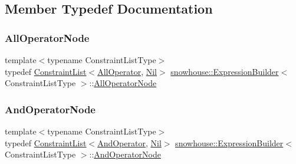 \subsection{Member Typedef Documentation}
\mbox{\label{structsnowhouse_1_1ExpressionBuilder_a25ac097d527e6c4fabd98aa1334a42c6}} 
\subsubsection{\texorpdfstring{AllOperatorNode}{AllOperatorNode}}
{\footnotesize\ttfamily template$<$typename Constraint\+List\+Type$>$ \\
typedef \mbox{\hyperlink{structsnowhouse_1_1ConstraintList}{Constraint\+List}}$<$\mbox{\hyperlink{structsnowhouse_1_1AllOperator}{All\+Operator}}, \mbox{\hyperlink{structsnowhouse_1_1Nil}{Nil}}$>$ \mbox{\hyperlink{structsnowhouse_1_1ExpressionBuilder}{snowhouse\+::\+Expression\+Builder}}$<$ Constraint\+List\+Type $>$\+::\mbox{\hyperlink{structsnowhouse_1_1ExpressionBuilder_a25ac097d527e6c4fabd98aa1334a42c6}{All\+Operator\+Node}}}

\mbox{\label{structsnowhouse_1_1ExpressionBuilder_acfa4ad415e3fac4f1a161d56268a99fc}} 
\subsubsection{\texorpdfstring{AndOperatorNode}{AndOperatorNode}}
{\footnotesize\ttfamily template$<$typename Constraint\+List\+Type$>$ \\
typedef \mbox{\hyperlink{structsnowhouse_1_1ConstraintList}{Constraint\+List}}$<$\mbox{\hyperlink{structsnowhouse_1_1AndOperator}{And\+Operator}}, \mbox{\hyperlink{structsnowhouse_1_1Nil}{Nil}}$>$ \mbox{\hyperlink{structsnowhouse_1_1ExpressionBuilder}{snowhouse\+::\+Expression\+Builder}}$<$ Constraint\+List\+Type $>$\+::\mbox{\hyperlink{structsnowhouse_1_1ExpressionBuilder_acfa4ad415e3fac4f1a161d56268a99fc}{And\+Operator\+Node}}}

